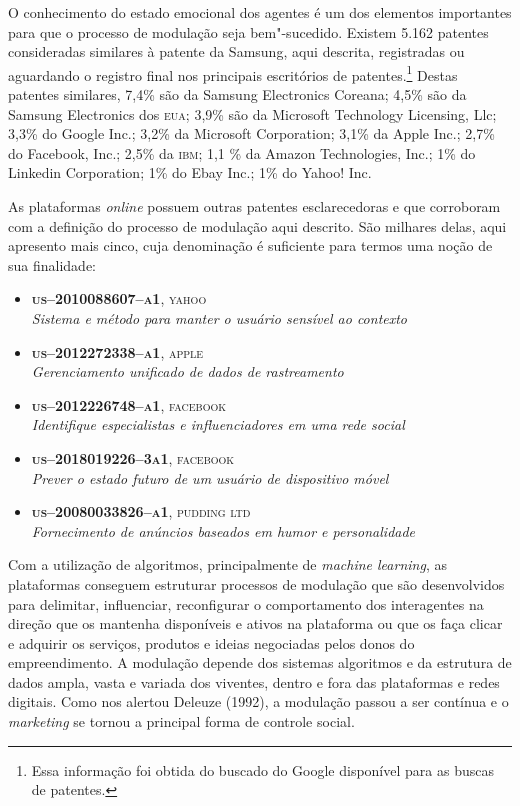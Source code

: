O conhecimento do estado emocional dos agentes é um dos elementos
importantes para que o processo de modulação seja bem"-sucedido. Existem
5.162 patentes consideradas similares à patente da Samsung, aqui
descrita, registradas ou aguardando o registro final nos principais
escritórios de patentes.\footnote{Essa informação foi obtida do buscado
  do Google disponível para as buscas de patentes.} Destas patentes
similares, 7,4\% são da Samsung Electronics Coreana; 4,5\% são da
Samsung Electronics dos \textsc{eua}; 3,9\% são da Microsoft Technology
Licensing, Llc; 3,3\% do Google Inc.; 3,2\% da Microsoft Corporation;
3,1\% da Apple Inc.; 2,7\% do Facebook, Inc.; 2,5\% da \textsc{ibm}; 1,1 \% da
Amazon Technologies, Inc.; 1\% do Linkedin Corporation; 1\% do Ebay
Inc.; 1\% do Yahoo! Inc.

As plataformas \emph{online} possuem outras patentes esclarecedoras e que
corroboram com a definição do processo de modulação aqui descrito. São
milhares delas, aqui apresento mais cinco, cuja denominação é suficiente
para termos uma noção de sua finalidade:

\small{
\begin{itemize}
\item
  \textsc{\textbf{us--2010088607--a1}, yahoo}\\
  \textit{Sistema e método para manter o usuário 
  sensível ao contexto}
\item
  \textsc{\textbf{us--2012272338--a1}, apple}\\
  \textit{Gerenciamento unificado de dados de rastreamento}
\item
  \textsc{\textbf{us--2012226748--a1}, facebook}\\
  \emph{Identifique especialistas e influenciadores em uma
  rede social}
\item
  \textsc{\textbf{us--2018019226--3a1}, facebook}\\
  \emph{Prever o estado futuro de um usuário de dispositivo
  móvel}
\item
  \textsc{\textbf{us--20080033826--a1}, pudding ltd}\\
  \emph{Fornecimento de anúncios baseados em humor e personalidade}
\end{itemize}
}

Com a utilização de algoritmos, principalmente de \emph{machine
learning}, as plataformas conseguem estruturar processos de modulação
que são desenvolvidos para delimitar, influenciar, reconfigurar o
comportamento dos interagentes na direção que os mantenha disponíveis e
ativos na plataforma ou que os faça clicar e adquirir os serviços,
produtos e ideias negociadas pelos donos do empreendimento. A modulação
depende dos sistemas algoritmos e da estrutura de dados ampla, vasta e
variada dos viventes, dentro e fora das plataformas e redes digitais.
Como nos alertou Deleuze (1992), a modulação passou a ser contínua e o
\emph{marketing} se tornou a principal forma de controle social.

